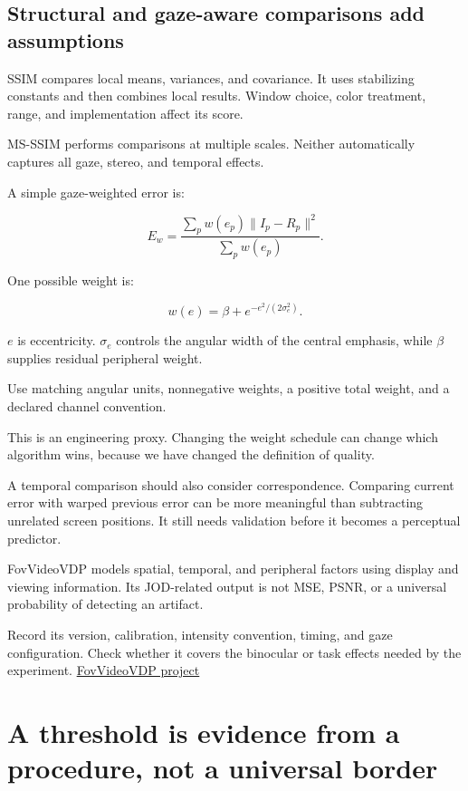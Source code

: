 \subsection{Structural and gaze-aware comparisons add assumptions}\label{04-visual-computing-ii-ch043-structural-and-gaze-aware-comparisons-add-assumptions}

SSIM compares local means, variances, and covariance. It uses stabilizing constants and then combines local results. Window choice, color treatment, range, and implementation affect its score.

MS-SSIM performs comparisons at multiple scales. Neither automatically captures all gaze, stereo, and temporal effects.

A simple gaze-weighted error is:

\[
E_w=
\frac{\sum_p w(e_p)\lVert I_p-R_p\rVert^2}
{\sum_p w(e_p)}.
\]

One possible weight is:

\[
w(e)=\beta+e^{-e^2/(2\sigma_e^2)}.
\]

\(e\) is eccentricity. \(\sigma_e\) controls the angular width of the central emphasis, while \(\beta\) supplies residual peripheral weight.

Use matching angular units, nonnegative weights, a positive total weight, and a declared channel convention.

This is an engineering proxy. Changing the weight schedule can change which algorithm wins, because we have changed the definition of quality.

A temporal comparison should also consider correspondence. Comparing current error with warped previous error can be more meaningful than subtracting unrelated screen positions. It still needs validation before it becomes a perceptual predictor.

FovVideoVDP models spatial, temporal, and peripheral factors using display and viewing information. Its JOD-related output is not MSE, PSNR, or a universal probability of detecting an artifact.

Record its version, calibration, intensity convention, timing, and gaze configuration. Check whether it covers the binocular or task effects needed by the experiment. \href{https://www.cl.cam.ac.uk/research/rainbow/projects/fovvideovdp/}{FovVideoVDP project}

\section{A threshold is evidence from a procedure, not a universal border}\label{04-visual-computing-ii-ch043-a-threshold-is-evidence-from-a-procedure-not-a-universal-border}

